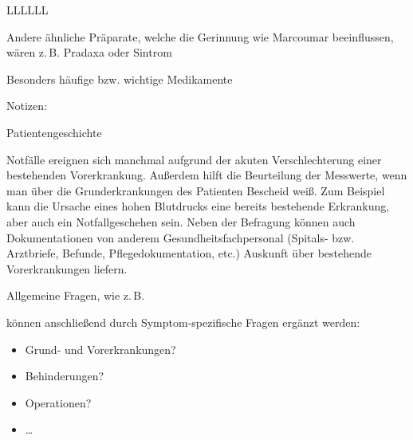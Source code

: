 {\begin{tabulary}{\linewidth}{LLLLLL}
\\\addlinespace\bottomrule
\end{tabulary}

{\noindent\footnotesize Andere ähnliche Präparate, welche die Gerinnung wie Marcoumar beeinflussen, wären z.\,B. Pradaxa{\texttrademark} oder Sintrom{\texttrademark}}}
{Besonders häufige bzw. wichtige Medikamente}
{}

Notizen: \TakeNotesLarge



{Patientengeschichte}
{Notfälle ereignen sich manchmal aufgrund der akuten
Verschlechterung einer bestehenden Vorerkrankung. Außerdem
hilft die Beurteilung der Messwerte, wenn man über die
Grunderkrankungen des Patienten Bescheid weiß. Zum Beispiel
kann die Ursache eines hohen Blutdrucks eine bereits
bestehende Erkrankung, aber auch ein Notfallgeschehen sein.
Neben der Befragung können auch Dokumentationen von anderem
Gesundheitsfachpersonal (Spitals- bzw. Arztbriefe, Befunde,
Pflegedokumentation, etc.) Auskunft über bestehende
Vorerkrankungen liefern.


Allgemeine Fragen,
wie z.\,B.
\begin{quote}
    
\end{quote}
können anschließend durch Symptom-spezifische Fragen ergänzt
werden:
\begin{quote}
    
    
\end{quote}}
{
\begin{itemize}
  \item Grund- und Vorerkrankungen?
  \item Behinderungen?
  \item Operationen?
  \item \ldots
\end{itemize}
}
{}
{}
{}


